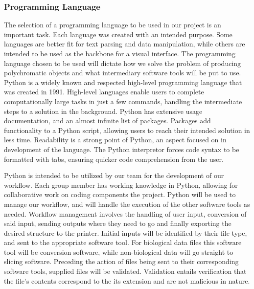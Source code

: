 \documentclass[letterpaper, onecolumn, draftclsnofoot, 10pt, compsoc]{IEEEtran}
\begin{document}
\begin{singlespace}
        \subsubsection{Programming Language}
        The selection of a programming language to be used in our project is an important task.
        Each language was created with an intended purpose.
        Some languages are better fit for text parsing and data manipulation, while others are intended to be used as the backbone for a visual interface.
   		The programming language chosen to be used will dictate how we solve the problem of producing polychromatic objects and what intermediary software tools will be put to use.
        Python is a widely known and respected high-level programming language that was created in 1991. \cite{python}
        High-level languages enable users to complete computationally large tasks in just a few commands, handling the intermediate steps to a solution in the background.
        Python has extensive usage documentation, and an almost infinite list of packages.
        Packages add functionality to a Python script, allowing users to reach their intended solution in less time. 
       	Readability is a strong point of Python, an aspect focused on in development of the language.
        The Python interpretor forces code syntax to be formatted with tabs, ensuring quicker code comprehension from the user.\par
        
 		Python is intended to be utilized by our team for the development of our workflow.
        Each group member has working knowledge in Python, allowing for collaborative work on coding components the project.
        Python will be used to manage our workflow, and will handle the execution of the other software tools as needed.
       	Workflow management involves the handling of user input, conversion of said input, sending outputs where they need to go and finally exporting the desired structure to the printer.
        Initial inputs will be identified by their file type, and sent to the appropriate software tool.
        For biological data files this software tool will be conversion software, while non-biological data will go straight to slicing software.
        Preceding the action of files being sent to their corresponding software tools, supplied files will be validated.
        Validation entails verification that the file's contents correspond to the its extension and are not malicious in nature.
        

\end{singlespace}
\end{document}
